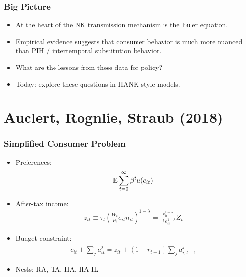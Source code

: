 \documentclass[english,xcolor=svgnames]{beamer}
\begin{document}
\begin{frame}
    \frametitle{Big Picture}
    \begin{itemize}
        \item At the heart of the NK transmission mechanism is the Euler equation. 
        \item Empirical evidence suggests that consumer behavior is much more nuanced than PIH / intertemporal substitution behavior.
        \item What are the lessons from these data for policy?
        \item Today: explore these questions in HANK style models.
	\end{itemize}
\end{frame}


\section{Auclert, Rognlie, Straub (2018)}


\begin{frame}
    \frametitle{Simplified Consumer Problem}
    \begin{itemize}
        \item Preferences:
        \begin{align*}
        	\mathbb{E} \sum_{t=0}^{\infty} \beta^t u(c_{it})
        \end{align*}
        \item After-tax income: 
        \begin{align*}
        	z_{it}\equiv \tau_t \left(\frac{W_t}{P_t}e_{it}n_{it}\right)^{1-\lambda} = \frac{e_{it}^{1-\lambda}}{\int e_{it}^{1-\lambda}} Z_t
        \end{align*}
        \item Budget constraint:
        \begin{align*}
        	c_{it} + \sum_j a_{it}^j = z_{it} + (1+r_{t-1})\sum_j a_{i,t-1}^j
        \end{align*}
        \item Nests: RA, TA, HA, HA-IL
	\end{itemize}
\end{frame}
\end{document}
